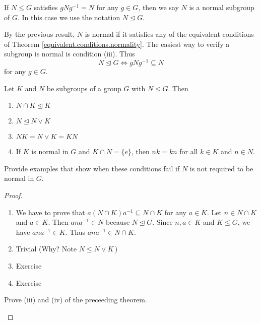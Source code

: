 \documentclass[11pt,a4paper]{article}
\begin{document}
\begin{defi}
    If \(N\leq G\) satisfies  \(gNg^{-1} = N\) for any \(g\in G\), then we say \(N\) is a normal subgroup of \(G\).
    In this case we use the notation \(N \unlhd G\).
\end{defi}

By the previous result, \(N\) is normal if it satisfies any of the equivalent conditions of Theorem \ref{equivalent.conditions.normality}.
The easiest way to verify a subgroup is normal is condition (iii).
Thus 
\[N\unlhd G\iff gNg^{-1}\subseteq N\] 
for any \(g\in G\).

\begin{teo}\label{thm:k.and.n.subgroups.of.G.and.N.normal}
    Let \(K\) and \(N\) be subgroups of a group \(G\) with \(N\unlhd G\). Then
    \begin{enumerate}[label=(\roman*)]
        \item \(N \cap K\unlhd K\) 
        \item \(N\unlhd N\vee K\)
        \item \(NK = N \vee K = KN\)
        \item If \(K\) is normal in \(G\) and \(K \cap N = \{e\}\), then \(nk = kn\) for all \(k \in K\) and \(n \in N\).
    \end{enumerate}
\end{teo}

\begin{eje}
    Provide examples that show when these conditions fail if \(N\) is not required to be normal in \(G\).
\end{eje}

\begin{proof}
\begin{enumerate}[label=(\roman*)]
    \item We have to prove that \(a (N\cap K) a^{-1}\subseteq N\cap K\) for any \(a\in K\).
     Let \(n \in N\cap K\) and \(a\in K\).
    Then \(ana^{-1}\in N\) because \(N\unlhd G\).
    Since \(n,a\in K\) and \(K\leq G\), we have \(ana^{-1}\in K\).
    Thus \(ana^{-1}\in N\cap K\).
    \item Trivial (Why? Note \(N \leq N \vee K\)\,)
    \item Exercise 
    \item Exercise
\end{enumerate}

\begin{eje}
    Prove (iii) and (iv) of the preceeding theorem.
\end{eje}

\end{proof}
 
\end{document}
